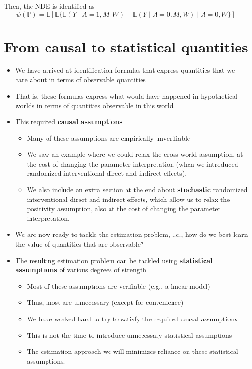 \documentclass[
  12pt,
]{book}
\providecommand{\tightlist}{%
  \setlength{\itemsep}{0pt}\setlength{\parskip}{0pt}}
\theoremstyle{definition}
\theoremstyle{definition}
\theoremstyle{definition}
\renewcommand{\P}{\mathbb{P}}
\newcommand{\E}{\mathbb{E}}
\newcommand{\1}{\mathbbm{1}}
\begin{document}
Then, the NDE is identified as
\begin{equation*}
    \psi(\P) = \E[\E\{\E(Y \mid A=1, M, W) - \E(Y \mid A=0, M, W) \mid A=0,W\}]
  \end{equation*}

\hypertarget{from-causal-to-statistical-quantities}{%
\section{From causal to statistical quantities}\label{from-causal-to-statistical-quantities}}

\begin{itemize}
\tightlist
\item
  We have arrived at identification formulas that express quantities that we
  care about in terms of observable quantities
\item
  That is, these formulas express what would have happened in hypothetical
  worlds in terms of quantities observable in this world.
\item
  This required \textbf{causal assumptions}

  \begin{itemize}
  \tightlist
  \item
    Many of these assumptions are empirically unverifiable
  \item
    We saw an example where we could relax the cross-world assumption, at the
    cost of changing the parameter interpretation (when we introduced randomized
    interventional direct and indirect effects).
  \item
    We also include an extra section at the end about \textbf{stochastic} randomized
    interventional direct and indirect effects, which allow us to relax the
    positivity assumption, also at the cost of changing the parameter
    interpretation.
  \end{itemize}
\item
  We are now ready to tackle the estimation problem, i.e., how do we best learn
  the value of quantities that are observable?
\item
  The resulting estimation problem can be tackled using \textbf{statistical
  assumptions} of various degrees of strength

  \begin{itemize}
  \tightlist
  \item
    Most of these assumptions are verifiable (e.g., a linear model)
  \item
    Thus, most are unnecessary (except for convenience)
  \item
    We have worked hard to try to satisfy the required causal assumptions
  \item
    This is not the time to introduce unnecessary statistical assumptions
  \item
    The estimation approach we will minimizes reliance on these statistical
    assumptions.
  \end{itemize}
\end{itemize}
\end{document}
